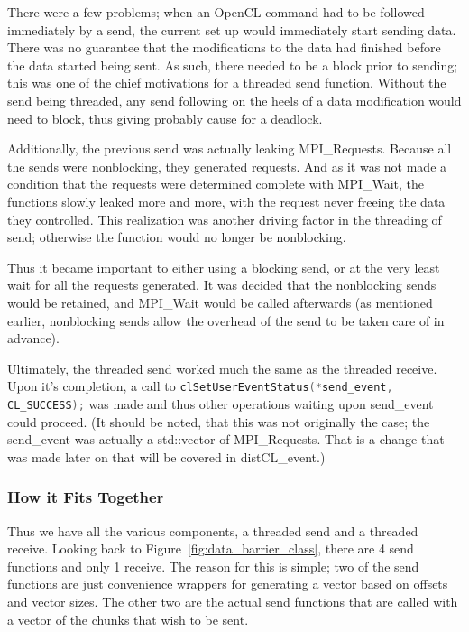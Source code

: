 \documentclass[../thesis.tex]{subfiles}
\begin{document}
    There were a few problems; when an OpenCL command had to be followed immediately by a send, the current set up would immediately start sending data. There was no guarantee that the modifications to the data had finished before the data started being sent. As such, there needed to be a block prior to sending; this was one of the chief motivations for a threaded send function. Without the send being threaded, any send following on the heels of a data modification would need to block, thus giving probably cause for a deadlock.

    Additionally, the previous send was actually leaking MPI\_Requests\cite{leakingmpi}. Because all the sends were nonblocking, they generated requests. And as it was not made a condition that the requests were determined complete with MPI\_Wait, the functions slowly leaked more and more, with the request never freeing the data they controlled. This realization was another driving factor in the threading of send; otherwise the function would no longer be nonblocking.

    Thus it became important to either using a blocking send, or at the very least wait for all the requests generated. It was decided that the nonblocking sends would be retained, and MPI\_Wait would be called afterwards (as mentioned earlier, nonblocking sends allow the overhead of the send to be taken care of in advance).

    Ultimately, the threaded send worked much the same as the threaded receive. Upon it's completion, a call to \lstinline[language=cpp]{clSetUserEventStatus(*send_event, CL_SUCCESS);} was made and thus other operations waiting upon send\_event could proceed. (It should be noted, that this was not originally the case; the send\_event was actually a std::vector of MPI\_Requests. That is a change that was made later on that will be covered in distCL\_event.)

  \subsubsection{How it Fits Together} %
  \label{ssub:how_it_fits_together}
    Thus we have all the various components, a threaded send and a threaded receive. Looking back to Figure~\ref{fig:data_barrier_class}, there are 4 send functions and only 1 receive. The reason for this is simple; two of the send functions are just convenience wrappers for generating a vector based on offsets and vector sizes. The other two are the actual send functions that are called with a vector of the chunks that wish to be sent.
\end{document}

